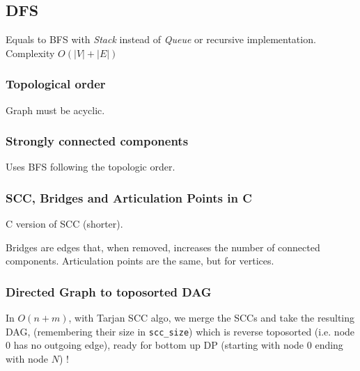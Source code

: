 \subsection{DFS}
Equals to BFS with \textit{Stack} instead of \textit{Queue} or recursive implementation. Complexity $O(|V|+|E|)$\\

\subsubsection{Topological order}
Graph must be acyclic. \\


\subsubsection{Strongly connected components}
Uses BFS following the topologic order. \\


\subsubsection{SCC, Bridges and Articulation Points in C}
C version of SCC (shorter).



Bridges are edges that, when removed, increases the number of connected components. Articulation points are the same, but for vertices.



\subsubsection{Directed Graph to toposorted DAG}
In $O(n + m)$, with Tarjan SCC algo,
we merge the SCCs and take the resulting DAG,
(remembering their size in \lstinline|scc_size|)
which is reverse toposorted (i.e. node 0 has no outgoing edge),
ready for bottom up DP (starting with node 0 ending with node $N$) !


